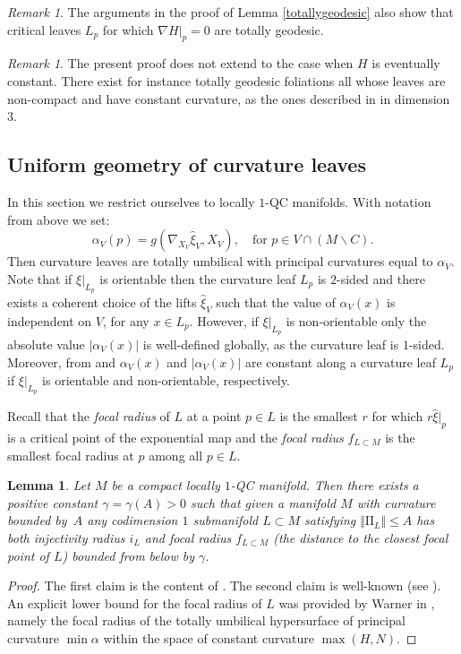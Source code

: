 \documentclass[10pt]{amsart}
\let\moins\smallsetminus
\newcommand{\II}{\mathrm{II}}
\let\parallel\Vert
\newtheorem{lemma}[theorem]{Lemma}
\theoremstyle{definition}
\theoremstyle{remark}
\newtheorem{remark}[theorem]{Remark}
\numberwithin{equation}{section}
\begin{document}
\begin{remark}
The arguments in the proof of Lemma \ref{totallygeodesic}
also show that critical leaves $L_p$ for which
$\nabla H|_p=0$ are totally geodesic.
\end{remark}

\begin{remark}
The present proof does not extend to the case when $H$ is eventually constant. There exist
for instance totally geodesic foliations all whose leaves are non-compact and have constant
curvature, as the ones described in \cite{Car-Ghys} in dimension $3$.
\end{remark}

\subsection{Uniform geometry of curvature leaves}\label{Uniformgeom}
In this section we restrict ourselves to locally $1$-QC manifolds.
With notation from above we set:
\[ \alpha_V(p)=g(\nabla_{X_V}\widehat{\xi}_V, X_V), \quad\text{for }  p\in V\cap (M\moins C).\]
Then curvature leaves are totally umbilical with principal curvatures equal to $\alpha_V$.
Note that if $\xi|_{L_p}$ is orientable then the curvature leaf $L_p$ is $2$-sided and there exists a coherent choice of the lifts $\widehat{\xi}_V$ such that the value of $\alpha_V(x)$ is independent on $V$, for any $x\in L_p$.
However, if $\xi|_{L_p}$ is non-orientable only the absolute value $|\alpha_V(x)|$ is well-defined globally,
as the curvature leaf is $1$-sided. Moreover, from \cite[(3.5)]{BP} and \cite[(3.4-3.5)(i)]{GM}
$\alpha_V(x)$ and $|\alpha_V(x)|$ are constant along a curvature leaf
$L_p$ if $\xi|_{L_p}$ is orientable and non-orientable, respectively.

Recall that the \emph{focal radius} of $L$ at a point $p\in L$ is the smallest $r$ for which $r\widehat{\xi}|_p$
is a critical point of the exponential map and the \emph{focal radius} $f_{L\subset M}$ is the smallest focal radius at $p$ among all $p\in L$.

\begin{lemma}\label{injectivity}
Let $M$ be a compact locally $1$-QC manifold. Then
there exists a positive constant $\gamma=\gamma(A)>0$ such that
given a manifold $M$ with curvature bounded by~$A$ any codimension $1$ submanifold $L\subset M$ satisfying $\parallel \II_{L} \parallel \leq A$ has both injectivity radius $i_L$ and focal radius $f_{L\subset M}$ (\ie the distance to the closest focal point of $L$)
bounded from below by $\gamma$.
\end{lemma}
\begin{proof}
The first claim is the content of \cite[Lem.\,3]{FG1}. The second claim is well-known (see \cite[Lem.\,2.3]{FG2}).
An explicit lower bound for the focal radius of $L$ was provided by Warner in \cite[Cor.\,4.2]{War}, namely the focal radius of the totally umbilical
hypersurface of principal curvature $\min \alpha$ within the space
of constant curvature $\max(H,N)$.
\end{proof}
\end{document}
